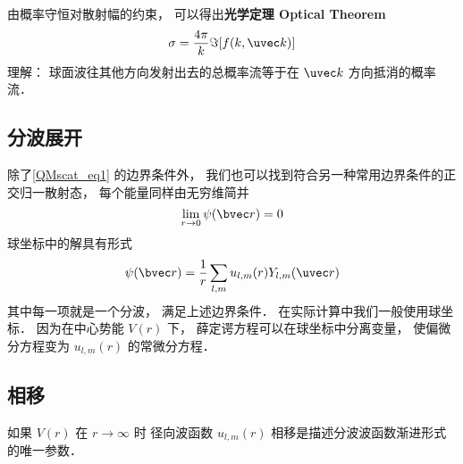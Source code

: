 由概率守恒对散射幅的约束， 可以得出\textbf{光学定理 Optical Theorem}
\begin{equation}
\sigma = \frac{4\pi}{k} \Im[f(k, \uvec k)]
\end{equation}
理解： 球面波往其他方向发射出去的总概率流等于在 $\uvec k$ 方向抵消的概率流．

\subsection{分波展开}
除了\autoref{QMscat_eq1} 的边界条件外， 我们也可以找到符合另一种常用边界条件的正交归一散射态， 每个能量同样由无穷维简并
\begin{equation}
\lim_{r\to 0} \psi(\bvec r) = 0
\end{equation}
球坐标中的解具有形式
\begin{equation}
\psi(\bvec r) = \frac{1}{r} \sum_{l,m} u_{l,m}(r) Y_{l,m}(\uvec r)
\end{equation}
其中每一项就是一个分波， 满足上述边界条件． 在实际计算中我们一般使用球坐标． 因为在中心势能 $V(r)$ 下， 薛定谔方程可以在球坐标中分离变量， 使偏微分方程变为 $u_{l,m}(r)$ 的常微分方程．


\subsection{相移}
如果 $V(r)$ 在 $r\to\infty$ 时 径向波函数 $u_{l,m}(r)$
相移是描述分波波函数渐进形式的唯一参数．
